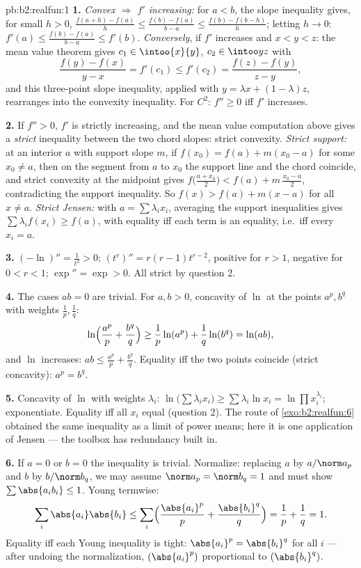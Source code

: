 \begin{solution}{pb:b2:realfun:1}
\textbf{1.} \emph{Convex $\Rightarrow$ $f'$ increasing:} for $a <
b$, the slope inequality gives, for small $h > 0$, $\frac{f(a+h)
- f(a)}h \leq \frac{f(b) - f(a)}{b-a} \leq \frac{f(b) -
f(b-h)}{h}$; letting $h \to 0$: $f'(a) \leq \frac{f(b) -
f(a)}{b - a} \leq f'(b)$. \emph{Conversely}, if $f'$ increases
and $x < y < z$: the mean value theorem gives $c_1 \in
\intoo{x}{y}$, $c_2 \in \intoo yz$ with
\[
\frac{f(y) - f(x)}{y - x} = f'(c_1) \leq f'(c_2)
= \frac{f(z) - f(y)}{z - y},
\]
and this three-point slope inequality, applied with $y = \lambda
x + (1 - \lambda)z$, rearranges into the convexity inequality.
For $C^2$: $f'' \geq 0$ iff $f'$ increases.

\textbf{2.} If $f'' > 0$, $f'$ is strictly increasing, and the
mean value computation above gives a \emph{strict} inequality
between the two chord slopes: strict convexity. \emph{Strict
support:} at an interior $a$ with support slope $m$, if $f(x_0) =
f(a) + m(x_0 - a)$ for some $x_0 \neq a$, then on the segment
from $a$ to $x_0$ the support line and the chord coincide, and
strict convexity at the midpoint gives $f\bigl(\frac{a +
x_0}2\bigr) < f(a) + m\,\frac{x_0 - a}2$, contradicting the
support inequality. So $f(x) > f(a) + m(x - a)$ for all $x \neq
a$. \emph{Strict Jensen:} with $a = \sum\lambda_ix_i$, averaging
the support inequalities gives $\sum\lambda_if(x_i) \geq f(a)$,
with equality iff each term is an equality, i.e.\ iff every $x_i
= a$.

\textbf{3.} $(-\ln)'' = \frac1{t^2} > 0$; $(t^r)'' = r(r -
1)t^{r-2}$, positive for $r > 1$, negative for $0 < r < 1$;
$\exp'' = \exp > 0$. All strict by question 2.

\textbf{4.} The cases $ab = 0$ are trivial. For $a, b > 0$,
concavity of $\ln$ at the points $a^p, b^q$ with weights
$\frac1p, \frac1q$:
\[
\ln\Bigl(\frac{a^p}p + \frac{b^q}q\Bigr) \geq
\frac1p\ln(a^p) + \frac1q\ln(b^q) = \ln(ab),
\]
and $\ln$ increases: $ab \leq \frac{a^p}p + \frac{b^q}q$.
Equality iff the two points coincide (strict concavity): $a^p =
b^q$.

\textbf{5.} Concavity of $\ln$ with weights $\lambda_i$:
$\ln\bigl(\sum\lambda_ix_i\bigr) \geq \sum\lambda_i\ln x_i =
\ln\prod x_i^{\lambda_i}$; exponentiate. Equality iff all $x_i$
equal (question 2). The route of \cref{exo:b2:realfun:6}
obtained the same inequality as a limit of power means; here it
is one application of Jensen --- the toolbox has redundancy
built in.

\textbf{6.} If $a = 0$ or $b = 0$ the inequality is trivial.
Normalize: replacing $a$ by $a/\norm a_p$ and $b$ by $b/\norm
b_q$, we may assume $\norm a_p = \norm b_q = 1$ and must show
$\sum\abs{a_ib_i} \leq 1$. Young termwise:
\[
\sum_i\abs{a_i}\abs{b_i} \leq
\sum_i\Bigl(\frac{\abs{a_i}^p}{p} +
\frac{\abs{b_i}^q}{q}\Bigr) = \frac1p + \frac1q = 1 .
\]
Equality iff each Young inequality is tight: $\abs{a_i}^p =
\abs{b_i}^q$ for all $i$ --- after undoing the normalization,
$(\abs{a_i}^p)$ proportional to $(\abs{b_i}^q)$.


\end{solution}
